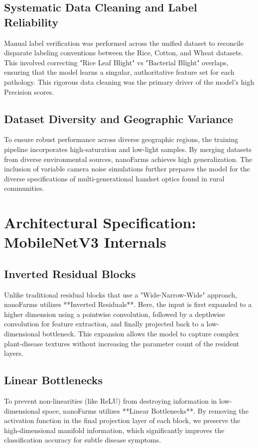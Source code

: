 \documentclass[11pt,onecolumn]{article}
\begin{document}
\subsection{Systematic Data Cleaning and Label Reliability}
Manual label verification was performed across the unified dataset to reconcile disparate labeling conventions between the Rice, Cotton, and Wheat datasets. This involved correcting "Rice Leaf Blight" vs "Bacterial Blight" overlaps, ensuring that the model learns a singular, authoritative feature set for each pathology. This rigorous data cleaning was the primary driver of the model's high Precision scores.

\subsection{Dataset Diversity and Geographic Variance}
To ensure robust performance across diverse geographic regions, the training pipeline incorporates high-saturation and low-light samples. By merging datasets from diverse environmental sources, nanoFarms achieves high generalization. The inclusion of variable camera noise simulations further prepares the model for the diverse specifications of multi-generational handset optics found in rural communities.

\section{Architectural Specification: MobileNetV3 Internals}

\subsection{Inverted Residual Blocks}
Unlike traditional residual blocks that use a "Wide-Narrow-Wide" approach, nanoFarms utilizes **Inverted Residuals**. Here, the input is first expanded to a higher dimension using a pointwise convolution, followed by a depthwise convolution for feature extraction, and finally projected back to a low-dimensional bottleneck. This expansion allows the model to capture complex plant-disease textures without increasing the parameter count of the resident layers.

\subsection{Linear Bottlenecks}
To prevent non-linearities (like ReLU) from destroying information in low-dimensional space, nanoFarms utilizes **Linear Bottlenecks**. By removing the activation function in the final projection layer of each block, we preserve the high-dimensional manifold information, which significantly improves the classification accuracy for subtle disease symptoms.
\end{document}
